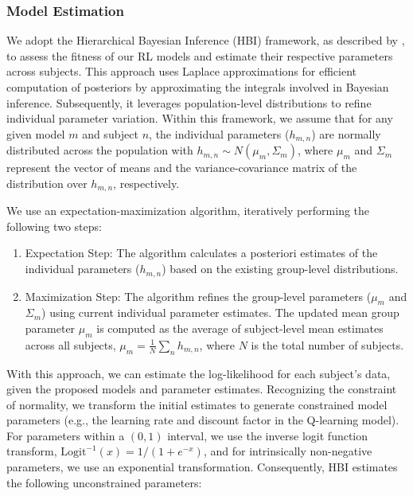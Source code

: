 \documentclass[
  number,
  preprint,
  3p,
  onecolumn]{elsarticle}
\providecommand{\tightlist}{%
  \setlength{\itemsep}{0pt}\setlength{\parskip}{0pt}}\usepackage{longtable,booktabs,array}
\begin{document}
\subsubsection{Model Estimation}\label{model-estimation}

We adopt the Hierarchical Bayesian Inference (HBI) framework, as
described by \citep{piray2019a}, to assess the fitness of our RL models
and estimate their respective parameters across subjects. This approach
uses Laplace approximations for efficient computation of posteriors by
approximating the integrals involved in Bayesian inference.
Subsequently, it leverages population-level distributions to refine
individual parameter variation. Within this framework, we assume that
for any given model \(m\) and subject \(n\), the individual parameters
(\(h_{m,n}\)) are normally distributed across the population with
\(h_{m,n} \sim N(\mu_m, \Sigma_m)\), where \(\mu_m\) and \(\Sigma_m\)
represent the vector of means and the variance-covariance matrix of the
distribution over \(h_{m,n}\), respectively.

We use an expectation-maximization algorithm, iteratively performing the
following two steps:

\begin{enumerate}
\def\labelenumi{\arabic{enumi}.}
\tightlist
\item
  Expectation Step: The algorithm calculates a posteriori estimates of
  the individual parameters (\(h_{m,n}\)) based on the existing
  group-level distributions.
\item
  Maximization Step: The algorithm refines the group-level parameters
  (\(\mu_m\) and \(\Sigma_m\)) using current individual parameter
  estimates. The updated mean group parameter \(\mu_m\) is computed as
  the average of subject-level mean estimates across all subjects,
  \(\mu_m = \frac{1}{N}\sum_{n}h_{m,n}\), where \(N\) is the total
  number of subjects.
\end{enumerate}

With this approach, we can estimate the log-likelihood for each
subject's data, given the proposed models and parameter estimates.
Recognizing the constraint of normality, we transform the initial
estimates to generate constrained model parameters (e.g., the learning
rate and discount factor in the Q-learning model). For parameters within
a \((0,1)\) interval, we use the inverse logit function transform,
\(\text{Logit}^{-1}(x)=1/(1+e^{-x})\), and for intrinsically
non-negative parameters, we use an exponential transformation.
Consequently, HBI estimates the following unconstrained parameters:
\end{document}
